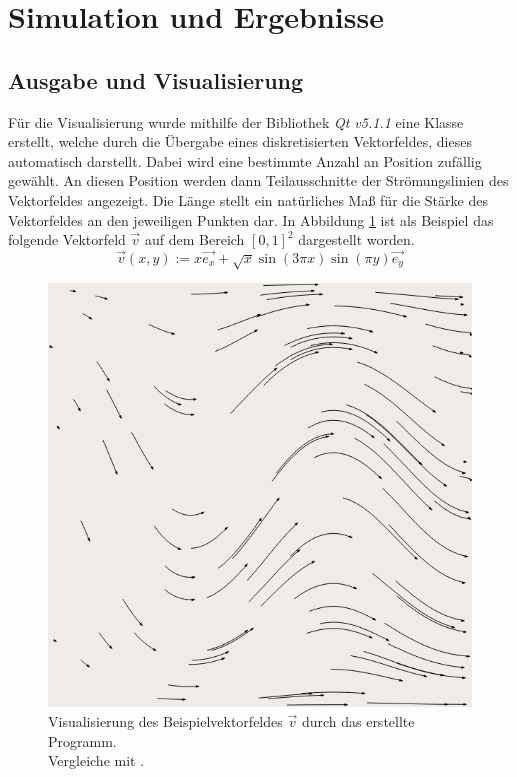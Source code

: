 \section{Simulation und Ergebnisse} %
\label{sec:simulation_und_ergebnisse}

	
	\subsection{Ausgabe und Visualisierung} %
	\label{sub:ausgabe_und_visualisierung}
	
		Für die Visualisierung wurde mithilfe der Bibliothek \textit{Qt v5.1.1} eine Klasse erstellt, welche durch die Übergabe eines diskretisierten Vektorfeldes, dieses automatisch darstellt.
		Dabei wird eine bestimmte Anzahl an Position zufällig gewählt.
		An diesen Position werden dann Teilausschnitte der Strömungslinien des Vektorfeldes angezeigt.
		Die Länge stellt ein natürliches Maß für die Stärke des Vektorfeldes an den jeweiligen Punkten dar.
		In Abbildung \ref{fig:example view} ist als Beispiel das folgende Vektorfeld $\vec{v}$ auf dem Bereich $[0,1]^2$ dargestellt worden.
		\[ \vec{v}(x,y) := x\vec{e_x} + \sqrt{x}\sin(3\pi x)\sin(\pi y)\vec{e_y} \]

		\begin{figure}[!htb]
			\center
			\includegraphics[scale = 0.35]{screenshots/example-01.png}
			\caption{Visualisierung des Beispielvektorfeldes $\vec{v}$ durch das erstellte Programm. \\ Vergleiche mit \cite{nsfd}.}
			\label{fig:example view}
		\end{figure}

